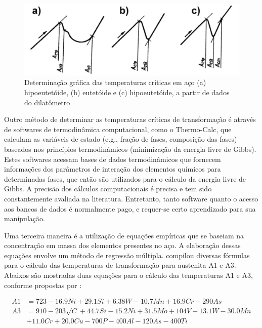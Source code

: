 \documentclass[brazil,tf,epusp]{usp}  %
\begin{document}
\begin{figure}[ht!]
  \includegraphics[width=.9\textwidth]{img/dilatometer.png}
  \caption{Determinação gráfica das temperaturas críticas em aço (a) hipoeutetóide, (b) eutetóide e (c) hipoeutetóide, a partir de dados do dilatômetro \cite{Pawlowski2012}}
  \label{fig:dilatometer}
\end{figure}

Outro método de determinar as temperaturas críticas de transformação é através de softwares de termodinâmica computacional, como o Thermo-Calc\textregistered{}, que calculam as variáveis de estado (e.g., fração de fases, composição das fases) baseados nos princípios termodinâmicos (minimização da energia livre de Gibbs). Estes softwares acessam bases de dados termodinâmicos que fornecem informações dos parâmetros de interação dos elementos químicos para determinadas fases, que então são utilizados para o cálculo da energia livre de Gibbs. A precisão dos cálculos computacionais é precisa e tem sido constantemente avaliada na literatura. Entretanto, tanto software quanto o acesso aos bancos de dados é normalmente pago, e requer-se certo aprendizado para sua manipulação.

Uma terceira maneira é a utilização de equações empíricas que se baseiam na concentração em massa dos elementos presentes no aço. A elaboração dessas equações envolve um método de regressão múltipla.  compilou diversas fórmulas para o cálculo das temperaturas de transformação para austenita A1 e A3. Abaixos são mostradas duas equações para o cálculo das temperaturas A1 e A3, conforme propostas por :

\begin{align}
  A1 &= 723 - 16.9 Ni + 29.1 Si + 6.38 W - 10.7 Mn + 16.9 Cr + 290 As \label{eq:andrewsA1}\\
  A3 &= 910 - 203 \sqrt{C}  + 44.7 Si - 15.2 Ni + 31.5 Mo + 104 V + 13.1 W - 30.0 Mn \nonumber \\
     & + 11.0 Cr + 20.0 Cu - 700 P - 400 Al - 120 As - 400 Ti \label{eq:andrewsA3}
\end{align}
\end{document}
